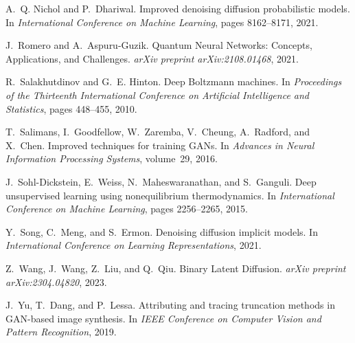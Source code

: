 \documentclass[11pt,letterpaper]{article}
\begin{document}
\begin{thebibliography}{99}
A.~Q. Nichol and P.~Dhariwal.
\newblock Improved denoising diffusion probabilistic models.
\newblock In \emph{International Conference on Machine Learning}, pages 8162--8171, 2021.

J.~Romero and A.~Aspuru-Guzik.
\newblock Quantum Neural Networks: Concepts, Applications, and Challenges.
\newblock \emph{arXiv preprint arXiv:2108.01468}, 2021.

R.~Salakhutdinov and G.~E. Hinton.
\newblock Deep Boltzmann machines.
\newblock In \emph{Proceedings of the Thirteenth International Conference on Artificial Intelligence and Statistics}, pages 448--455, 2010.

T.~Salimans, I.~Goodfellow, W.~Zaremba, V.~Cheung, A.~Radford, and X.~Chen.
\newblock Improved techniques for training GANs.
\newblock In \emph{Advances in Neural Information Processing Systems}, volume~29, 2016.

J.~Sohl-Dickstein, E.~Weiss, N.~Maheswaranathan, and S.~Ganguli.
\newblock Deep unsupervised learning using nonequilibrium thermodynamics.
\newblock In \emph{International Conference on Machine Learning}, pages 2256--2265, 2015.

Y.~Song, C.~Meng, and S.~Ermon.
\newblock Denoising diffusion implicit models.
\newblock In \emph{International Conference on Learning Representations}, 2021.

Z.~Wang, J.~Wang, Z.~Liu, and Q.~Qiu.
\newblock Binary Latent Diffusion.
\newblock \emph{arXiv preprint arXiv:2304.04820}, 2023.

J.~Yu, T.~Dang, and P.~Lessa.
\newblock Attributing and tracing truncation methods in GAN-based image synthesis.
\newblock In \emph{IEEE Conference on Computer Vision and Pattern Recognition}, 2019.

\end{thebibliography}
\end{document}
